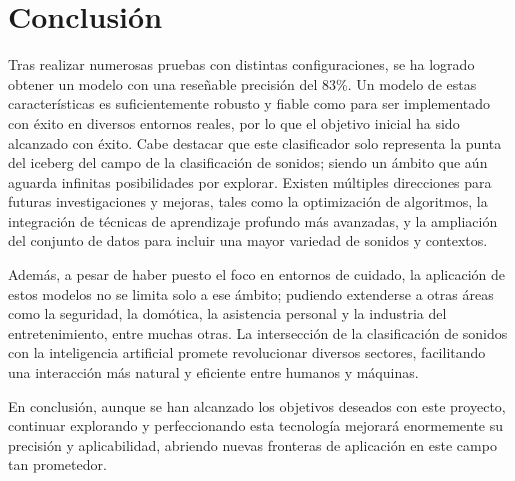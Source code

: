 
\section{Conclusión}
Tras realizar numerosas pruebas con distintas configuraciones, se ha logrado obtener un modelo con una reseñable precisión del 83\%. Un modelo de estas características es suficientemente robusto y fiable como para  ser implementado con éxito en diversos entornos reales, por lo que el objetivo inicial ha sido alcanzado con éxito. Cabe destacar que este clasificador solo representa la punta del iceberg del campo de la clasificación de sonidos; siendo un ámbito que aún aguarda infinitas posibilidades por explorar. Existen múltiples direcciones para futuras investigaciones y mejoras, tales como la optimización de algoritmos, la integración de técnicas de aprendizaje profundo más avanzadas, y la ampliación del conjunto de datos para incluir una mayor variedad de sonidos y contextos.

Además, a pesar de haber puesto el foco en entornos de cuidado, la aplicación de estos modelos no se limita solo a ese ámbito; pudiendo extenderse a otras áreas como la seguridad, la domótica, la asistencia personal y la industria del entretenimiento, entre muchas otras. La intersección de la clasificación de sonidos con la inteligencia artificial promete revolucionar diversos sectores, facilitando una interacción más natural y eficiente entre humanos y máquinas.


En conclusión, aunque se han alcanzado los objetivos deseados con este proyecto, continuar explorando y perfeccionando esta tecnología mejorará enormemente su precisión y aplicabilidad, abriendo nuevas fronteras de aplicación en este campo tan prometedor.
